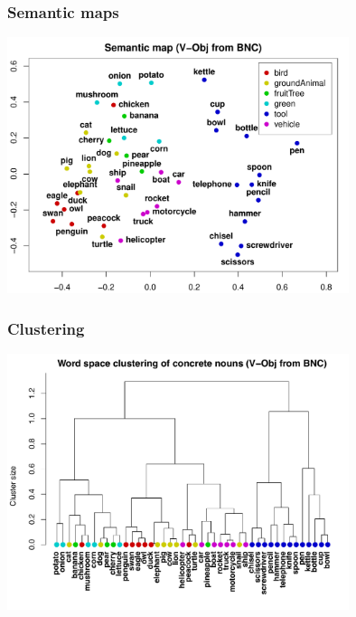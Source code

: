 \documentclass[t]{beamer} %
\begin{document}
\begin{frame}[c]
  \frametitle{Semantic maps}

  \begin{center}
    \includegraphics[width=100mm]{img/hieroglyph_semantic_map}
  \end{center}
\end{frame}

\begin{frame}[c]
  \frametitle{Clustering}

  \begin{center}
    \includegraphics[width=100mm]{img/hieroglyph_clustering}
  \end{center}
\end{frame}
\end{document}

